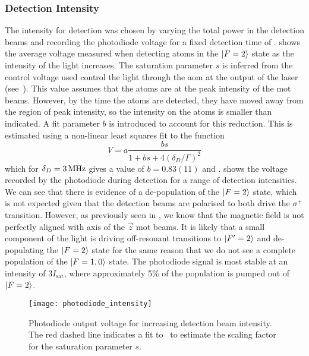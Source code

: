 \subsubsection{Detection Intensity}
The intensity for detection was chosen by varying the total power
in the detection beams and recording the photodiode voltage for a
fixed detection time of .
 shows the average voltage
measured when detecting atoms in the \(\ket{F=2}\) state as the
intensity of the light increases. The saturation parameter \(s\) is
inferred from the control voltage used control the light
through the \ac{aom} at the output of the
\Muquans laser (see~). This value
assumes that the atoms are at the peak
intensity of the \ac{mot} beams. However, by the time the atoms are detected,
they have moved away from the region of peak intensity, so the
intensity on the atoms is smaller than indicated. A fit parameter $b$
is introduced to account for this reduction. This is estimated using a non-linear least squares fit
to the function
\begin{equation}
  V = a\frac{b s}{1 + b s + 4 \left(\delta_D/\Gamma\right)^2}
  \label{eq:voltage_fit}
\end{equation}
which for $\delta_D = \sivalue{3}{\MHz}$ gives a value of \(b =
0.83(11)\)
and .  shows the voltage recorded by the
photodiode during detection for a range of detection intensities.
We can see that there is evidence of a de-population of the
$\ket{F=2}$ state, which is not expected given that the detection
beams are polarised to both drive the $\sigma^+$ transition. However,
as previously seen in
, we know that the magnetic field is not
perfectly aligned with axis of the $\vec{z}$ \ac{mot} beams. It is
likely that a small component of the light is driving off-resonant
transitions to $\ket{F'=2}$ and de-populating the $\ket{F=2}$ state
for the same reason that we do not see a complete population of the
$\ket{F=1,0}$ state.
The photodiode signal is most stable at an intensity of
3\(I_\text{sat}\), where approximately 5\% of the population is
pumped out of \(\ket{F=2}\).
\begin{figure}[htpb!]
  \centering
  \texttt{[image: photodiode\_intensity]}
  \caption[Photodiode output voltage for increasing detection beam
  intensity. ]{Photodiode output voltage for increasing detection beam
  intensity. The red dashed line indicates a fit
to~ to estimate the scaling factor for the
saturation parameter \(s\).}
  \label{fig:photodiode_intensity_calib}
\end{figure}

